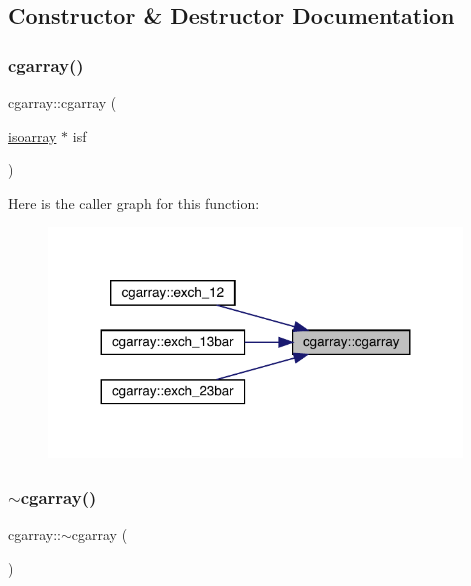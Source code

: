 \subsection{Constructor \& Destructor Documentation}
\mbox{\label{classcgarray_a0a9d804cf3256428f8d8937749a8b776}} 
\subsubsection{\texorpdfstring{cgarray()}{cgarray()}\hspace{0.1cm}{\footnotesize\ttfamily [1/2]}}
{\footnotesize\ttfamily cgarray\+::cgarray (\begin{DoxyParamCaption}\item[{\mbox{\hyperlink{classisoarray}{isoarray}} $\ast$}]{isf }\end{DoxyParamCaption})}

Here is the caller graph for this function\+:\nopagebreak
\begin{figure}[H]
\begin{center}
\leavevmode
\includegraphics[width=311pt]{d7/d55/classcgarray_a0a9d804cf3256428f8d8937749a8b776_icgraph}
\end{center}
\end{figure}
\mbox{\label{classcgarray_af332defc2438028410ad8e2ae98aa848}} 
\subsubsection{\texorpdfstring{$\sim$cgarray()}{~cgarray()}\hspace{0.1cm}{\footnotesize\ttfamily [1/2]}}
{\footnotesize\ttfamily cgarray\+::$\sim$cgarray (\begin{DoxyParamCaption}{ }\end{DoxyParamCaption})}

